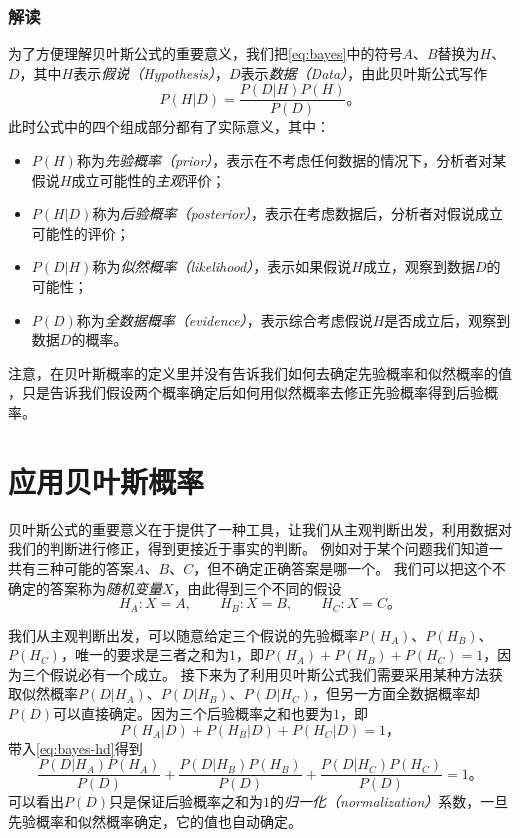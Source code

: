 \subsubsection{解读}
为了方便理解贝叶斯公式的重要意义，我们把\cref{eq:bayes}中的符号$A$、$B$替换为$H$、$D$，其中$H$表示\emph{假说（Hypothesis）}，$D$表示\emph{数据（Data）}，由此贝叶斯公式写作
\begin{equation}\label{eq:bayes-hd}
    P(H|D)=\frac{P(D|H)P(H)}{P(D)}。
\end{equation}
此时公式中的四个组成部分都有了实际意义，其中：
\begin{itemize}
    \item $P(H)$称为\emph{先验概率（prior）}，表示在不考虑任何数据的情况下，分析者对某假说$H$成立可能性的\emph{主观}评价；
    \item $P(H|D)$称为\emph{后验概率（posterior）}，表示在考虑数据后，分析者对假说成立可能性的评价；
    \item $P(D|H)$称为\emph{似然概率（likelihood）}，表示如果假说$H$成立，观察到数据$D$的可能性；
    \item $P(D)$称为\emph{全数据概率（evidence）}，表示综合考虑假说$H$是否成立后，观察到数据$D$的概率。
\end{itemize}

注意，在贝叶斯概率的定义里并没有告诉我们如何去确定先验概率和似然概率的值%
，只是告诉我们假设两个概率确定后如何用似然概率去修正先验概率得到后验概率。

\section{应用贝叶斯概率}

贝叶斯公式的重要意义在于提供了一种工具，让我们从主观判断出发，利用数据对我们的判断进行修正，得到更接近于事实的判断。
例如对于某个问题我们知道一共有三种可能的答案$A$、$B$、$C$，但不确定正确答案是哪一个。
我们可以把这个不确定的答案称为\emph{随机变量}$X$，由此得到三个不同的假设
\begin{equation*}
    H_A:X=A,\qquad H_B:X=B,\qquad H_C:X=C。
\end{equation*}

我们从主观判断出发，可以随意给定三个假说的先验概率$P(H_A)$、$P(H_B)$、$P(H_C)$，唯一的要求是三者之和为$1$，即$P(H_A)+P(H_B)+P(H_C)=1$，因为三个假说必有一个成立。
接下来为了利用贝叶斯公式我们需要采用某种方法获取似然概率$P(D|H_A)$、$P(D|H_B)$、$P(D|H_C)$，但另一方面全数据概率却$P(D)$可以直接确定。因为三个后验概率之和也要为$1$，即
\begin{equation*}
    P(H_A|D)+P(H_B|D)+P(H_C|D)=1，
\end{equation*}
带入\cref{eq:bayes-hd}得到
\begin{equation}
    \frac{P(D|H_A)P(H_A)}{P(D)}+\frac{P(D|H_B)P(H_B)}{P(D)}+\frac{P(D|H_C)P(H_C)}{P(D)}=1。
\end{equation}
可以看出$P(D)$只是保证后验概率之和为$1$的\emph{归一化（normalization）}系数，一旦先验概率和似然概率确定，它的值也自动确定。


